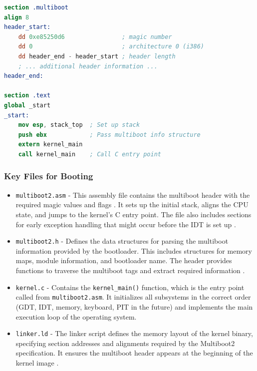 \documentclass[a4paper,11pt]{article}
\begin{document}
\begin{lstlisting}[language=nasm]
section .multiboot
align 8
header_start:
    dd 0xe85250d6                ; magic number
    dd 0                         ; architecture 0 (i386)
    dd header_end - header_start ; header length
    ; ... additional header information ...
header_end:

section .text
global _start
_start:
    mov esp, stack_top  ; Set up stack
    push ebx            ; Pass multiboot info structure
    extern kernel_main
    call kernel_main    ; Call C entry point
\end{lstlisting}

\subsubsection{Key Files for Booting}
\begin{itemize}
    \item \texttt{multiboot2.asm} - This assembly file contains the multiboot header with the required magic values and flags \cite{Magic_number}. It sets up the initial stack, aligns the CPU state, and jumps to the kernel's C entry point. The file also includes sections for early exception handling that might occur before the IDT is set up \cite{multiboot2} \cite{Multiboot}.
    
    \item \texttt{multiboot2.h} - Defines the data structures for parsing the multiboot information provided by the bootloader. This includes structures for memory maps, module information, and bootloader name. The header provides functions to traverse the multiboot tags and extract required information \cite{multiboot2} \cite{Multiboot}.
    
    \item \texttt{kernel.c} - Contains the \texttt{kernel\_main()} function, which is the entry point called from \texttt{multiboot2.asm}. It initializes all subsystems in the correct order (GDT, IDT, memory, keyboard, PIT in the future) and implements the main execution loop of the operating system.
    
    \item \texttt{linker.ld} - The linker script defines the memory layout of the kernel binary, specifying section addresses and alignments required by the Multiboot2 specification. It ensures the multiboot header appears at the beginning of the kernel image \cite{Multiboot}.
\end{itemize}
\end{document}
